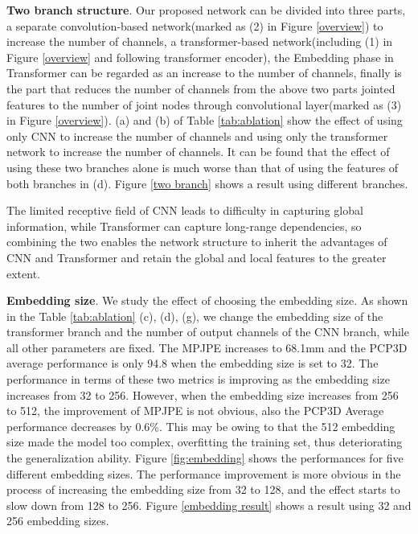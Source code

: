 \documentclass[lettersize,journal]{IEEEtran}
\begin{document}
\par \textbf{Two branch structure}.
Our proposed network can be divided into three parts,
a separate convolution-based network(marked as (2) in Figure \ref{overview}) to increase the number of channels, a transformer-based network(including (1) in Figure \ref{overview} and following transformer encoder), the Embedding phase in Transformer can be regarded as an increase to the number of channels, finally is the part that reduces the number of channels from the above two parts jointed features to the number of joint nodes through convolutional layer(marked as (3) in Figure \ref{overview}). (a) and (b) of Table \ref{tab:ablation} show the effect of using only CNN to increase the number of channels and using only the transformer network to increase the number of channels. It can be found that the effect of using these two branches alone is much worse than that of using the features of both branches in (d). Figure \ref{two branch} shows a result using different branches.
\par The limited receptive field of CNN leads to difficulty in capturing global information, while Transformer can capture long-range dependencies, so combining the two enables the network structure to inherit the advantages of CNN and Transformer and retain the global and local features to the greater extent.

\par \textbf{Embedding size}.
We study the effect of choosing the embedding size. As shown in the Table \ref{tab:ablation} (c), (d), (g), we change the embedding size of the transformer branch and the number of output channels of the CNN branch, while all other parameters are fixed. The MPJPE increases to 68.1mm and the PCP3D average performance is only 94.8 when the embedding size is set to 32. The performance in terms of these two metrics is improving as the embedding size increases from 32 to 256. However, when the embedding size increases from 256 to 512, the improvement of MPJPE is not obvious, also the PCP3D Average performance decreases by 0.6\%. This may be owing to that the 512 embedding size made the model too complex, overfitting the training set, thus deteriorating the generalization ability. Figure \ref{fig:embedding} shows the performances for five different embedding sizes. The performance improvement is more obvious in the process of increasing the embedding size from 32 to 128, and the effect starts to slow down from 128 to 256. Figure \ref{embedding result} shows a result using 32 and 256 embedding sizes.
\end{document}

